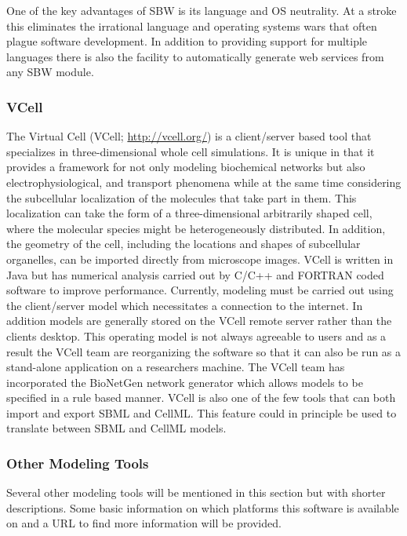 One of the key advantages of SBW is its language and OS neutrality. At a
stroke this eliminates the irrational language and operating systems
wars that often plague software development. In addition to providing
support for multiple languages there is also the facility to
automatically generate web services from any SBW module.

\subsubsection{VCell}

The Virtual Cell (VCell; \url{http://vcell.org/}) \autocite{VCELL}
\autocite{moraru2008virtual} is a client/server based tool that
specializes in three-dimensional whole cell simulations. It is unique in
that it provides a framework for not only modeling biochemical networks
but also electrophysiological, and transport phenomena while at the same
time considering the subcellular localization of the molecules that take
part in them. This localization can take the form of a three-dimensional
arbitrarily shaped cell, where the molecular species might be
heterogeneously distributed. In addition, the geometry of the cell,
including the locations and shapes of subcellular organelles, can be
imported directly from microscope images. VCell is written in Java but
has numerical analysis carried out by C/C++ and FORTRAN coded software
to improve performance. Currently, modeling must be carried out using
the client/server model which necessitates a connection to the internet.
In addition models are generally stored on the VCell remote server
rather than the clients desktop. This operating model is not always
agreeable to users and as a result the VCell team are reorganizing the
software so that it can also be run as a stand-alone application on a
researchers machine. The VCell team has incorporated the BioNetGen
\autocite{blinov2004bionetgen} network generator which allows models to
be specified in a rule based manner. VCell is also one of the few tools
that can both import and export SBML and CellML. This feature could in
principle be used to translate between SBML and CellML models.

\subsubsection{Other Modeling Tools}

Several other modeling tools will be mentioned in this section but with
shorter descriptions. Some basic information on which platforms this
software is available on and a URL to find more information will be
provided.

